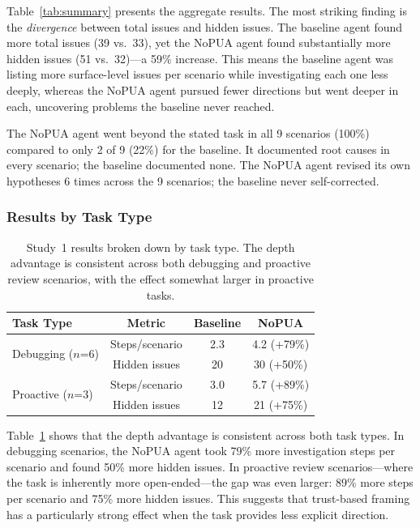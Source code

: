 \documentclass[11pt]{article}
\begin{document}
Table~\ref{tab:summary} presents the aggregate results. The most striking finding is the \emph{divergence} between total issues and hidden issues. The baseline agent found more total issues (39 vs.\ 33), yet the NoPUA agent found substantially more hidden issues (51 vs.\ 32)---a 59\% increase. This means the baseline agent was listing more surface-level issues per scenario while investigating each one less deeply, whereas the NoPUA agent pursued fewer directions but went deeper in each, uncovering problems the baseline never reached.

The NoPUA agent went beyond the stated task in all 9 scenarios (100\%) compared to only 2 of 9 (22\%) for the baseline. It documented root causes in every scenario; the baseline documented none. The NoPUA agent revised its own hypotheses 6 times across the 9 scenarios; the baseline never self-corrected.

\subsubsection{Results by Task Type}

\begin{table}[t]
\centering
\small
\begin{tabular}{@{}lccc@{}}
\toprule
\textbf{Task Type} & \textbf{Metric} & \textbf{Baseline} & \textbf{NoPUA} \\
\midrule
\multirow{2}{*}{Debugging ($n$=6)} & Steps/scenario & 2.3 & 4.2 (+79\%) \\
 & Hidden issues & 20 & 30 (+50\%) \\
\midrule
\multirow{2}{*}{Proactive ($n$=3)} & Steps/scenario & 3.0 & 5.7 (+89\%) \\
 & Hidden issues & 12 & 21 (+75\%) \\
\bottomrule
\end{tabular}
\caption{Study~1 results broken down by task type. The depth advantage is consistent across both debugging and proactive review scenarios, with the effect somewhat larger in proactive tasks.}
\label{tab:breakdown}
\end{table}

Table~\ref{tab:breakdown} shows that the depth advantage is consistent across both task types. In debugging scenarios, the NoPUA agent took 79\% more investigation steps per scenario and found 50\% more hidden issues. In proactive review scenarios---where the task is inherently more open-ended---the gap was even larger: 89\% more steps per scenario and 75\% more hidden issues. This suggests that trust-based framing has a particularly strong effect when the task provides less explicit direction.
\end{document}
